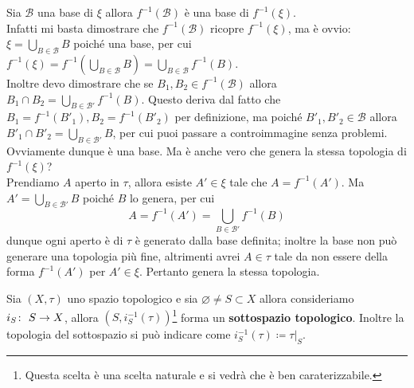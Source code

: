 \begin{remark}
	\label{remark:induced_bases_by_a_map}
	Sia $\mathcal{B}$ una base di $\xi$ allora $f^{-1}(\mathcal{B})$ è una base di $f^{-1}(\xi)$. \\ Infatti mi basta dimostrare che $f^{-1}(\mathcal{B})$ ricopre $f^{-1}(\xi)$, ma è ovvio: $\xi = \bigcup_{B \in \mathcal{B}} B$ poiché una base, per cui $f^{-1}(\xi) = f^{-1}(\bigcup_{B \in \mathcal{B}} B) = \bigcup_{B \in \mathcal{B}} f^{-1}(B)$. \\ Inoltre devo dimostrare che se $B_1, B_2 \in f^{-1}(\mathcal{B})$ allora $B_1 \cap B_2 = \bigcup_{B \in \mathcal{B}'}f^{-1}(B)$. Questo deriva dal fatto che $B_1 = f^{-1}(B'_1), B_2 = f^{-1}(B'_2)$ per definizione, ma poiché $B'_1, B'_2 \in \mathcal{B}$ allora $B'_1 \cap B'_2 = \bigcup_{B \in \mathcal{B}'} B$, per cui puoi passare a controimmagine senza problemi. \\
	
	Ovviamente dunque è una base. Ma è anche vero che genera la stessa topologia di $f^{-1}(\xi)$? \\ Prendiamo $A$ aperto in $\tau$, allora esiste $A' \in \xi$ tale che $A = f^{-1}(A')$. Ma $A' = \bigcup_{B \in \mathcal{B}'} B$ poiché $B$ lo genera, per cui
	\begin{equation*}
		A = f^{-1}(A') = \bigcup_{B \in \mathcal{B}'} f^{-1}(B) 
	\end{equation*}
	dunque ogni aperto è di $\tau$ è generato dalla base definita; inoltre la base non può generare una topologia più fine, altrimenti avrei $A \in \tau$ tale da non essere della forma $f^{-1}(A')$ per $A' \in \xi$. Pertanto genera la stessa topologia.
\end{remark}

\begin{definition}
	Sia $(X,\tau)$ uno spazio topologico e sia $\varnothing \neq S \subset X$ allora consideriamo $i_S \colon\ S \rightarrow X$, allora $(S, i^{-1}_S(\tau))$\footnote{Questa scelta è una scelta naturale e si vedrà che è ben caraterizzabile.} forma un \textbf{sottospazio topologico}. Inoltre la topologia del sottospazio si può indicare come $i^{-1}_S(\tau) \coloneqq \tau|_S$. 
\end{definition}

